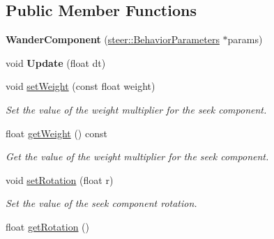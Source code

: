 \subsection*{Public Member Functions}
\begin{DoxyCompactItemize}
\item 
\hypertarget{classsteer_1_1_wander_component_aac30556d156d8f7dc1bae57ac8919148}{{\bfseries Wander\-Component} (\hyperlink{structsteer_1_1_behavior_parameters}{steer\-::\-Behavior\-Parameters} $\ast$params)}\label{classsteer_1_1_wander_component_aac30556d156d8f7dc1bae57ac8919148}

\item 
\hypertarget{classsteer_1_1_wander_component_a6f4e2b363c300c5cf372c14d733fef1f}{void {\bfseries Update} (float dt)}\label{classsteer_1_1_wander_component_a6f4e2b363c300c5cf372c14d733fef1f}

\item 
void \hyperlink{classsteer_1_1_wander_component_a395f1351ae56b347b9b369853ff3f81d}{set\-Weight} (const float weight)
\begin{DoxyCompactList}\small\item\em Set the value of the weight multiplier for the seek component. \end{DoxyCompactList}\item 
\hypertarget{classsteer_1_1_wander_component_ade044e7fe51d92ea53101c41a480bb34}{float \hyperlink{classsteer_1_1_wander_component_ade044e7fe51d92ea53101c41a480bb34}{get\-Weight} () const }\label{classsteer_1_1_wander_component_ade044e7fe51d92ea53101c41a480bb34}

\begin{DoxyCompactList}\small\item\em Get the value of the weight multiplier for the seek component. \end{DoxyCompactList}\item 
\hypertarget{classsteer_1_1_wander_component_a35dbaf830f2a1771b89168cf0e5d3ddf}{void \hyperlink{classsteer_1_1_wander_component_a35dbaf830f2a1771b89168cf0e5d3ddf}{set\-Rotation} (float r)}\label{classsteer_1_1_wander_component_a35dbaf830f2a1771b89168cf0e5d3ddf}

\begin{DoxyCompactList}\small\item\em Set the value of the seek component rotation. \end{DoxyCompactList}\item 
\hypertarget{classsteer_1_1_wander_component_afaeb73f4dc652cdacf8222989088bb9b}{float \hyperlink{classsteer_1_1_wander_component_afaeb73f4dc652cdacf8222989088bb9b}{get\-Rotation} ()}\label{classsteer_1_1_wander_component_afaeb73f4dc652cdacf8222989088bb9b}


\end{DoxyCompactItemize}
